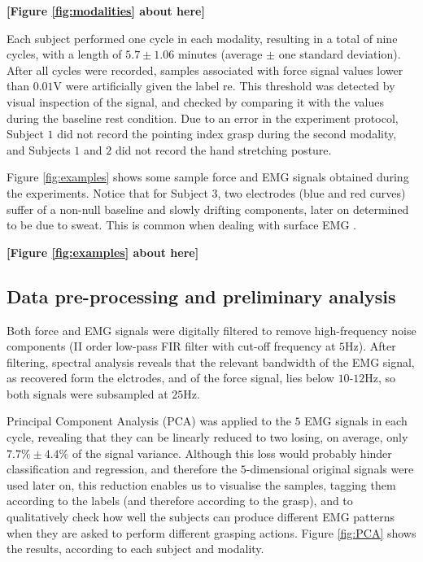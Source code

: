 \documentclass[review,authoryear]{elsarticle}
\def\re{\textsf{re}}
\renewcommand{\cite}{\citep}
\begin{document}
\noindent \textbf{[Figure \ref{fig:modalities} about here]}

Each subject performed one cycle in each modality, resulting in a total
of nine cycles, with a length of $5.7 \pm 1.06$ minutes (average
$\pm$ one standard deviation). After all cycles were recorded, samples
associated with force signal values lower than $0.01$V were artificially
given the label \re. This threshold was detected by visual inspection
of the signal, and checked by comparing it with the values during the 
baseline rest condition. Due to an error in the
experiment protocol, Subject $1$ did not record the pointing index
grasp during the second modality, and Subjects $1$ and $2$ did not
record the hand stretching posture.

Figure \ref{fig:examples} shows some sample force and EMG signals obtained
during the experiments. Notice that for Subject $3$, two electrodes (blue and
red curves) suffer of a non-null baseline and slowly drifting components,
later on determined to be due to sweat. This is common when dealing with
surface EMG \cite{deluca97,deluca02}.

\noindent \textbf{[Figure \ref{fig:examples} about here]}

\subsection{Data pre-processing and preliminary analysis}

Both force and EMG signals were digitally filtered
to remove high-frequency noise components (II order low-pass FIR filter
with cut-off frequency at $5$Hz). After filtering, spectral analysis
reveals that the relevant bandwidth of the
EMG signal, as recovered form the elctrodes, and of the force signal,
lies below $10$-$12$Hz, so both signals were subsampled at $25$Hz.

Principal Component Analysis (PCA) was applied to the $5$ EMG signals in
each cycle, revealing that they can be linearly reduced to two losing,
on average, only $7.7\% \pm 4.4\%$ of the signal variance. Although this
loss would probably hinder classification and regression, and therefore
the $5$-dimensional original signals were used later on, this reduction
enables us to visualise the samples, tagging them according to the labels
(and therefore according to the grasp), and to qualitatively check
how well the subjects can produce different EMG
patterns when they are asked to perform different grasping
actions. Figure \ref{fig:PCA} shows the results, according to each
subject and modality.
\end{document}

